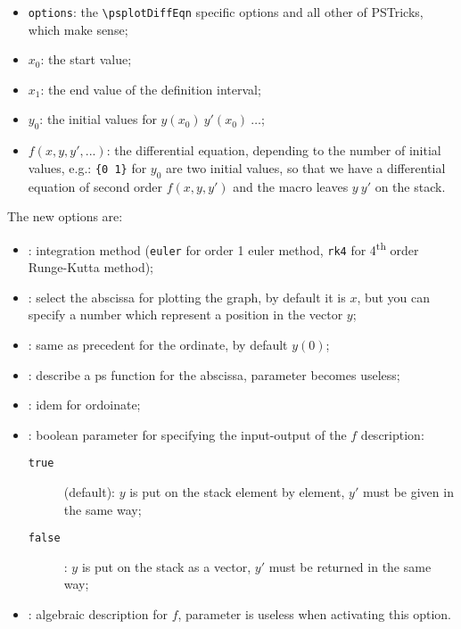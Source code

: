 \begin{itemize}\setlength\itemsep{0pt}\setlength\parsep{0pt}\setlength\parskip{0pt}
\item \verb+options+: the \verb+\psplotDiffEqn+ specific options and all other of PSTricks, which
make sense;
\item $x_0$: the start value;
\item $x_1$: the end value of the definition interval;
\item $y_0$: the initial values for $y(x_0)\ y'(x_0)\ \ldots$;
\item $f(x,y,y',...)$: the differential equation, depending to the number of initial values, e.g.:
    \verb+{0 1}+ for $y_0$ are two initial values, so that we have a differential equation of
    second order $f(x,y,y')$ and the macro leaves $y\ y'$ on the stack.
\end{itemize}

The new options are:


\begin{itemize}\setlength\itemsep{0pt}\setlength\parsep{0pt}\setlength\parskip{0pt}
\item {}: integration method (\verb+euler+ for order 1 euler method, \verb+rk4+ for
  4\textsuperscript{th} order Runge-Kutta method);
\item {}: select the abscissa for plotting the graph, by default it is
  $x$, but you can specify a number which represent a position in the vector $y$;
\item {}: same as precedent for the ordinate, by default $y(0)$;
\item {}: describe a ps function for the abscissa, parameter
   becomes useless;
\item {}: idem for ordoinate;
\item {}: boolean parameter for specifying the input-output of the
  $f$ description:
  \begin{description}
  \item[\texttt{true}] (default): $y$ is put on the stack element by element, $y'$
    must be given in the same way;
  \item[\texttt{false}]: $y$ is put on the stack as a vector, $y'$ must be returned
  in the same way;
  \end{description}

\item {}: algebraic description for $f$, 
  parameter is useless when activating this option.
\end{itemize}


